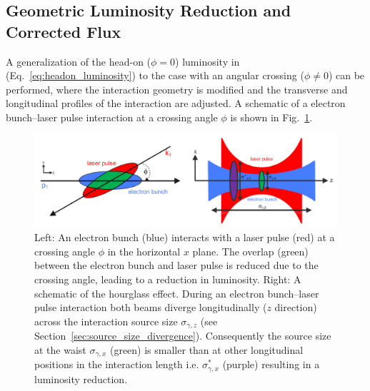 \documentclass[../main.tex]{subfiles}
\begin{document}
\subsection{Geometric Luminosity Reduction and Corrected Flux}
\label{sec:geometric_luminosity_reduction}

A generalization of the head-on ($\phi = 0$) luminosity in (Eq.~\ref{eq:headon_luminosity}) to the case with an angular crossing ($\phi \neq 0$) can be performed, where the interaction geometry is modified and the transverse and longitudinal profiles of the interaction are adjusted. A schematic of a electron bunch--laser pulse interaction at a crossing angle $\phi$ is shown in Fig.~\ref{fig:angular_crossing_hourglass_effect}.
\begin{figure}[!h]
\centering
\includegraphics[width=\textwidth]{Figures/Photon_Production_by_Inverse_Compton_Scattering/angular_crossing_hourglass_effect.pdf}
\caption{Left: An electron bunch (blue) interacts with a laser pulse (red) at a crossing angle $\phi$ in the horizontal $x$ plane. The overlap (green) between the electron bunch and laser pulse is reduced due to the crossing angle, leading to a reduction in luminosity. Right: A schematic of the hourglass effect. During an electron bunch--laser pulse interaction both beams diverge longitudinally ($z$ direction) across the interaction source size $\sigma_{\gamma,z}$ (see Section~\ref{sec:source_size_divergence}). Consequently the source size at the waist $\sigma_{\gamma,x}$ (green) is smaller than at other longitudinal positions in the interaction length i.e. $\sigma_{\gamma,x}^{*}$ (purple) resulting in a luminosity reduction.}
\label{fig:angular_crossing_hourglass_effect}
\end{figure}
\end{document}
